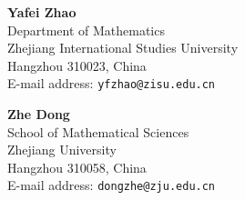 \documentclass[12pt]{article}
\theoremstyle{definition}
\theoremstyle{remark}
\begin{document}
\noindent
\begin{minipage}{\textwidth}
\noindent\textbf{Yafei Zhao}\\
Department of Mathematics\\
Zhejiang International Studies University\\
Hangzhou 310023, China\\
E-mail address: \texttt{yfzhao@zisu.edu.cn}

\medskip
\noindent\textbf{Zhe Dong}\\
School of Mathematical Sciences\\
Zhejiang University\\
Hangzhou 310058, China\\
E-mail address: \texttt{dongzhe@zju.edu.cn}
\end{minipage}
\end{document}
